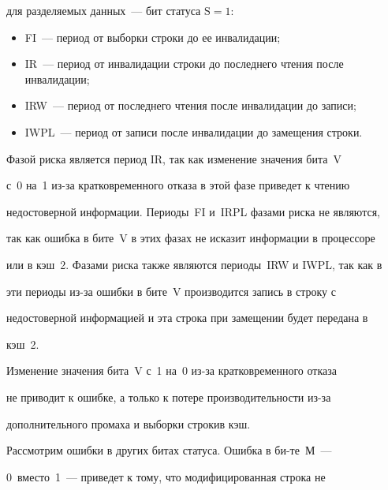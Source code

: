 для разделяемых данных~--- бит статуса $\mathrm{S}=1$:


      \begin{itemize}


\item FI~--- период от выборки строки до ее инвалидации;


\item IR~--- период от инвалидации строки до последнего чтения после инвалидации;


\item IRW~--- период от последнего чтения после инвалидации до записи;


\item IWPL~--- период от записи после инвалидации до замещения строки.


\end{itemize}





      Фазой риска является период IR, так как изменение  значения бита~V 


с~0 на~1 из-за кратковременного отказа в этой фазе приведет к чтению 


недостоверной информации. Периоды~FI и~IRPL фазами риска не являются, 


так как ошибка в  бите~V  в этих фазах не  исказит информации в процессоре 


или в кэш~2. Фазами риска также являются периоды~IRW и IWPL, так как в 


эти периоды из-за ошибки в бите~V производится запись в  строку с 


недостоверной информацией и эта строка при замещении будет передана в 


кэш~2.


      


      Изменение  значения бита~V с~1 на~0 из-за кратковременного отказа  


не приводит к ошибке, а только к потере производительности из-за 


дополнительного промаха и выборки строки\linebreak в кэш. 


      


      Рассмотрим ошибки в других битах статуса. Ошибка в би-\linebreak те~М~--- 


0~вместо~1~--- приведет к тому, что модифицированная строка не 


